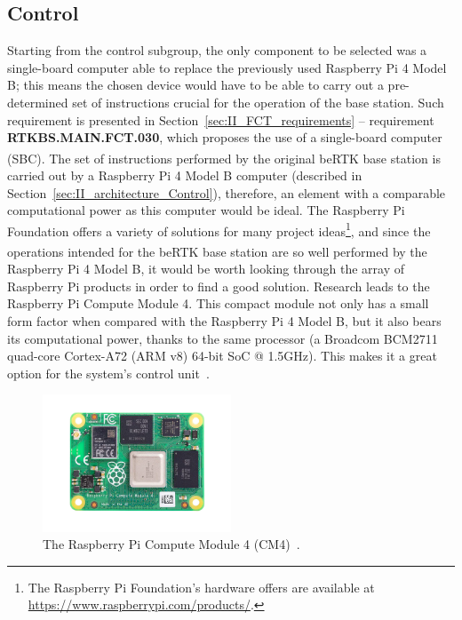 
\subsection{Control}\label{sec:311_Control}

Starting from the control subgroup, the only component to be selected was a single-board computer able to replace the previously used Raspberry Pi 4 Model B; this means the chosen device would have to be able to carry out a pre-determined set of instructions crucial for the operation of the base station. Such requirement is presented in Section~\ref{sec:II_FCT_requirements} -- requirement \textbf{RTKBS.MAIN.FCT.030}, which proposes the use of a single-board computer (SBC).
The set of instructions performed by the original beRTK\textsuperscript{\textregistered} base station is carried out by a Raspberry Pi 4 Model B computer (described in Section~\ref{sec:II_architecture_Control}), therefore, an element with a comparable computational power as this computer would be ideal. The Raspberry Pi Foundation offers a variety of solutions for many project ideas\footnote[7]{The Raspberry Pi Foundation's hardware offers are available at \url{https://www.raspberrypi.com/products/}.}, and since the operations intended for the beRTK\textsuperscript{\textregistered} base station are so well performed by the Raspberry Pi 4 Model B, it would be worth looking through the array of Raspberry Pi products in order to find a good solution. Research leads to the Raspberry Pi Compute Module 4.
This compact module not only has a small form factor when compared with the Raspberry Pi 4 Model B, but it also bears its computational power, thanks to the same processor (a Broadcom BCM2711 quad-core Cortex-A72 (ARM v8) 64-bit SoC @ 1.5GHz). This makes it a great option for the system's control unit~\cite{CM4}.

\begin{figure}[h]
	\centering
	\includegraphics[width=0.5\textwidth]{Chapters/Figures/CM4.png}
	\caption{The Raspberry Pi Compute Module 4 (CM4)~\cite{CM4}.}
	\label{fig:CM4}
\end{figure}

